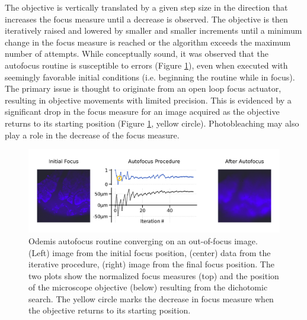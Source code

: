 The objective is vertically translated by a given step size in the direction that increases the focus measure until a decrease is observed. The objective is then iteratively raised and lowered by smaller and smaller increments until a minimum change in the focus measure is reached or the algorithm exceeds the maximum number of attempts. While conceptually sound, it was observed that the autofocus routine is susceptible to errors (Figure \ref{fig:A.1_afruns}), even when executed with seemingly favorable initial conditions (i.e. beginning the routine while in focus). The primary issue is thought to originate from an open loop focus actuator, resulting in objective movements with limited precision. This is evidenced by a significant drop in the focus measure for an image acquired as the objective returns to its starting position (Figure \ref{fig:A.1_afruns}, yellow circle). Photobleaching may also play a role in the decrease of the focus measure.

\begin{figure}[!tb]
    \centering
    \includegraphics[width=\linewidth]{cppendix-A/figures/figA-1_afruns.pdf}
    \caption{Odemis autofocus routine converging on an out-of-focus image.
    (Left) image from the initial focus position, (center) data from the iterative procedure, (right) image from the final focus position. The two plots show the normalized focus measures (top) and the position of the microscope objective (below) resulting from the dichotomic search. The yellow circle marks the decrease in focus measure when the objective returns to its starting position.}
    \label{fig:A.1_afruns}
\end{figure}



